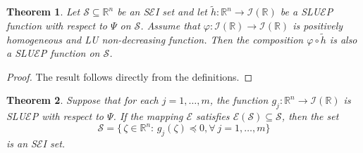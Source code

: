 \documentclass[12pt, reqno]{amsart}
\newtheorem{theorem}{Theorem}[section]
\theoremstyle{definition}
\theoremstyle{remark}
\numberwithin{equation}{section}
\begin{document}
       \begin{theorem}
       	Let ${\mathcal{S}} \subseteq \mathbb{R}^{n}$ be an S$\mathcal{E}$I set and let $\tilde{h} : \mathbb{R}^{n} \to \mathcal{I}(\mathbb{R})$ be a SLU$\mathcal{E}$P function with respect to ${\Psi}$ on ${\mathcal{S}}$. Assume that ${\varphi} : \mathcal{I}(\mathbb{R}) \to \mathcal{I}(\mathbb{R})$ is positively homogeneous and LU non-decreasing function. Then the composition ${\varphi} \circ \tilde{h}$ is also a SLU$\mathcal{E}$P function on ${\mathcal{S}}$.
       \end{theorem}
       \begin{proof} The result follows directly from the definitions.

       \end{proof}
       \begin{theorem} \label{theorem 3.8}
Suppose that for each $j = 1, \dots, m$, the function $g_j : \mathbb{R}^{n} \to \mathcal{I}(\mathbb{R})$ is SLU$\mathcal{E}$P with respect to $\Psi$. If the mapping $\mathcal{E}$ satisfies $\mathcal{E}(\mathcal{S}) \subseteq \mathcal{S}$, then the set
\[
\mathcal{S} = \big\{\, \zeta \in \mathbb{R}^{n} :\, g_j(\zeta) \preceq 0 , \forall ~j = 1, \dots, m \big\}
\]
is an S$\mathcal{E}$I set.
\end{theorem}
\end{document}
